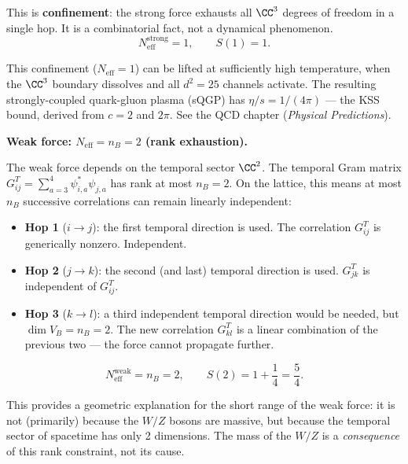 This is \textbf{confinement}: the strong force exhausts all $\CC^3$ degrees of freedom in a single hop. It is a combinatorial fact, not a dynamical phenomenon.
\begin{equation}
N_\text{eff}^\text{strong} = 1, \qquad S(1) = 1.
\end{equation}

\begin{remark}
This confinement ($N_\text{eff} = 1$) can be lifted at sufficiently high temperature, when the $\CC^3$ boundary dissolves and all $d^2 = 25$ channels activate. The resulting strongly-coupled quark-gluon plasma (sQGP) has $\eta/s = 1/(4\pi)$ --- the KSS bound, derived from $c = 2$ and $2\pi$. See the QCD chapter (\textit{Physical Predictions}).
\end{remark}

\bigskip

\noindent\textbf{Weak force: $N_\text{eff} = n_B = 2$ (rank exhaustion).}

The weak force depends on the temporal sector $\CC^2$. The temporal Gram matrix $G^T_{ij} = \sum_{a=3}^{4}\psi^*_{i,a}\psi_{j,a}$ has rank at most $n_B = 2$. On the lattice, this means at most $n_B$ successive correlations can remain linearly independent:

\begin{itemize}
\item \textbf{Hop 1} ($i \to j$): the first temporal direction is used. The correlation $G^T_{ij}$ is generically nonzero. Independent.
\item \textbf{Hop 2} ($j \to k$): the second (and last) temporal direction is used. $G^T_{jk}$ is independent of $G^T_{ij}$.
\item \textbf{Hop 3} ($k \to l$): a third independent temporal direction would be needed, but $\dim V_B = n_B = 2$. The new correlation $G^T_{kl}$ is a linear combination of the previous two --- the force cannot propagate further.
\end{itemize}

\begin{equation}
N_\text{eff}^\text{weak} = n_B = 2, \qquad S(2) = 1 + \frac{1}{4} = \frac{5}{4}.
\end{equation}

\begin{remark}
This provides a geometric explanation for the short range of the weak force: it is not (primarily) because the $W/Z$ bosons are massive, but because the temporal sector of spacetime has only 2 dimensions. The mass of the $W/Z$ is a \emph{consequence} of this rank constraint, not its cause.
\end{remark}

